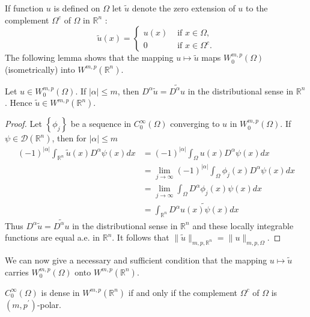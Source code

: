 \begin{para}
  If function $u$ is defined on $\Omega$ let $\tilde{u}$ denote the zero extension of $u$
  to the complement $\Omega^c$ of $\Omega$ in $\mathbb{R}^n$ :
  \[
  \tilde{u}(x)= \begin{cases}u(x) & \text { if } x \in \Omega, \\ 0 & \text { if } x \in \Omega^c .\end{cases}
  \]
  The following lemma shows that the mapping $u \mapsto \tilde{u}$
  maps $W_0^{m, p}(\Omega)$ (isometrically) into $W^{m,p}\left(\mathbb{R}^n\right)$.
\end{para}

\begin{lemma}
  Let $u \in W_0^{m, p}(\Omega)$. If $|\alpha| \leq m$,
  then $D^\alpha \tilde{u}=\widetilde{D^\alpha u}$ in the distributional sense in $\mathbb{R}^n$. 
  Hence $\tilde{u} \in W^{m,p}\left(\mathbb{R}^n\right)$.
\end{lemma}

\begin{proof}
  Let $\left\{\phi_j\right\}$ be a sequence in $C_0^{\infty}(\Omega)$ converging to $u$ in $W_0^{m, p}(\Omega)$. If $\psi \in \mathscr{D}\left(\mathbb{R}^n\right)$, then for $|\alpha| \leq m$
  \[
  \begin{aligned}
  (-1)^{|\alpha|} \int_{\mathbb{R}^n} \tilde{u}(x) D^\alpha \psi(x) d x & =(-1)^{|\alpha|} \int_{\Omega} u(x) D^\alpha \psi(x) d x \\
  & =\lim _{j \rightarrow \infty}(-1)^{|\alpha|} \int_{\Omega} \phi_j(x) D^\alpha \psi(x) d x \\
  & =\lim _{j \rightarrow \infty} \int_{\Omega} D^\alpha \phi_j(x) \psi(x) d x \\
  & =\int_{\mathbb{R}^n} \widetilde{D^\alpha u(x) \psi(x) d x}
  \end{aligned}
  \]
  Thus $D^\alpha \tilde{u}=\widetilde{D^\alpha u}$ in the distributional sense
  in $\mathbb{R}^n$ and these locally integrable functions are equal a.e. in $\mathbb{R}^n$.
  It follows that $\|\tilde{u}\|_{m, p, \mathbb{R}^n}=\|u\|_{m, p, \Omega}$.
\end{proof}

We can now give a necessary and sufficient condition that the mapping $u \mapsto \tilde{u}$ 
carries $W_0^{m, p}(\Omega)$ onto $W^{m,p}\left(\mathbb{R}^n\right)$.

\begin{theorem}
  $C_0^{\infty}(\Omega)$ is dense in $W^{m,p}\left(\mathbb{R}^n\right)$ if and only if the 
  complement $\Omega^c$ of $\Omega$ is $\left(m, p^{\prime}\right)$-polar.
\end{theorem}

